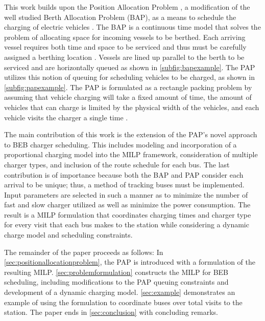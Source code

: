 This work builds upon the Position Allocation Problem \cite{qarebagh-2019-optim-sched}, a modification of the well
studied Berth Allocation Problem (BAP), as a means to schedule the charging of electric vehicles
\cite{buhrkal-2011-model-discr,frojan-2015-contin-berth,imai-2001-dynam-berth}. The BAP is a continuous time model that
solves the problem of allocating space for incoming vessels to be berthed. Each arriving vessel requires both time and
space to be serviced and thus must be carefully assigned a berthing location \cite{imai-2001-dynam-berth}. Vessels are
lined up parallel to the berth to be serviced and are horizontally queued as shown in \autoref{subfig:bapexample}. The
PAP utilizes this notion of queuing for scheduling vehicles to be charged, as shown in \autoref{subfig:papexample}. The
PAP is formulated as a rectangle packing problem by assuming that vehicle charging will take a fixed amount of time, the
amount of vehicles that can charge is limited by the physical width of the vehicles, and each vehicle visits the charger
a single time \cite{qarebagh-2019-optim-sched}.

The main contribution of this work is the extension of the PAP's novel approach to BEB charger scheduling. This includes
modeling and incorporation of a proportional charging model into the MILP framework, consideration of multiple charger
types, and inclusion of the route schedule for each bus. The last contribution is of importance because both the BAP and
PAP consider each arrival to be unique; thus, a method of tracking buses must be implemented. Input parameters are
selected in such a manner as to minimize the number of fast and slow charger utilized as well as minimize the power
consumption. The result is a MILP formulation that coordinates charging times and charger type for every visit that each
bus makes to the station while considering a dynamic charge model and scheduling constraints.

The remainder of the paper proceeds as follows: In \autoref{sec:positionallocationproblem}, the PAP is introduced with a
formulation of the resulting MILP. \autoref{sec:problemformulation} constructs the MILP for BEB scheduling, including
modifications to the PAP queuing constraints and development of a dynamic charging model. \autoref{sec:example}
demonstrates an example of using the formulation to coordinate \A buses over \N total visits to the station. The paper
ends in \autoref{sec:conclusion} with concluding remarks.
